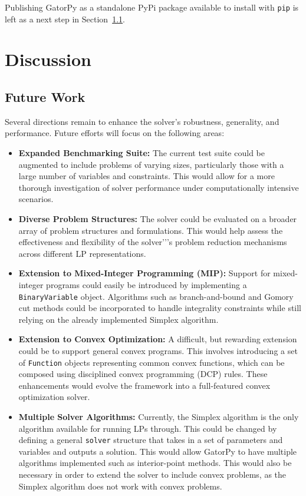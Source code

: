 \documentclass[conference]{IEEEtran}
\begin{document}
Publishing GatorPy as a standalone PyPi package available to install with \texttt{pip} is left as a next step in Section~\ref{sss:future_work}.

\section{Discussion}
\label{sse:discussion}
\subsection{Future Work}
\label{sss:future_work}
Several directions remain to enhance the solver's robustness, generality, and performance. 
Future efforts will focus on the following areas:

\begin{itemize}
    \item \textbf{Expanded Benchmarking Suite:} The current test suite could be augmented to include problems of varying sizes, particularly those with a large number of variables and constraints. 
    This would allow for a more thorough investigation of solver performance under computationally intensive scenarios.

    \item \textbf{Diverse Problem Structures:} The solver could be evaluated on a broader array of problem structures and formulations. 
    This would help assess the effectiveness and flexibility of the solver'’'s problem reduction mechanisms across different LP representations.

    \item \textbf{Extension to Mixed-Integer Programming (MIP):} Support for mixed-integer programs could easily be introduced by implementing a \texttt{BinaryVariable} object. 
    Algorithms such as branch-and-bound and Gomory cut methods could be incorporated to handle integrality constraints while still relying on the already implemented Simplex algorithm.

    \item \textbf{Extension to Convex Optimization:} A difficult, but rewarding extension could be to support general convex programs. 
    This involves introducing a set of \texttt{Function} objects representing common convex functions, which can be composed using disciplined convex programming (DCP) rules. 
    These enhancements would evolve the framework into a full-featured convex optimization solver.

    \item \textbf{Multiple Solver Algorithms:} Currently, the Simplex algorithm is the only algorithm available for running LPs through.
    This could be changed by defining a general \texttt{solver} structure that takes in a set of parameters and variables and outputs a solution.
    This would allow GatorPy to have multiple algorithms implemented such as interior-point methods.
    This would also be necessary in order to extend the solver to include convex problems, as the Simplex algorithm does not work with convex problems.


\end{itemize}
\end{document}
